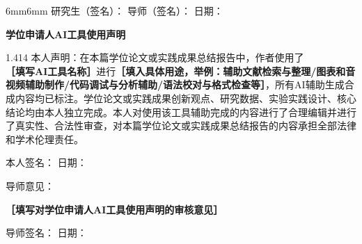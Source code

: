 \begin{titlepage}
\begin{adjustwidth}{6mm}{6mm}
\vspace{1.5\baselineskip}
{\STZhongsong 研究生（签名）：} \hspace{20mm} {\STZhongsong 导师（签名）：} \hspace{20mm} {\STZhongsong 日期：}


\newpage   %



\makebox[30mm]{\vspace{0mm}}
\begin{center}
\heiti{} \textbf{学位申请人AI工具使用声明} 
\end{center}
\vspace{1.5\baselineskip}
\begin{spacing}{1.414}
\STZhongsong{} 本人声明：在本篇学位论文或实践成果总结报告中，作者使用了\\ \hspace*{1mm}\textbf{［填写AI工具名称］}进行\textbf{［填入具体用途，举例：辅助文献检索与整理/图表和音视频辅助制作/代码调试与分析辅助/语法校对与格式检查等］}，所有AI辅助生成合成内容均已标注。学位论文或实践成果创新观点、研究数据、实验实践设计、核心结论均由本人独立完成。本人对使用该工具辅助完成的内容进行了合理编辑并进行了真实性、合法性审查，对本篇学位论文或实践成果总结报告的内容承担全部法律和学术伦理责任。
\end{spacing}

\vspace{1.5\baselineskip}
{\STZhongsong 本人签名：} \hspace{40mm} {\STZhongsong 日期：}

\vspace{3\baselineskip}
{\STZhongsong 导师意见：}

\textbf{{\STZhongsong{} ［填写对学位申请人AI工具使用声明的审核意见］ }}

\vspace{3\baselineskip}
{\STZhongsong 导师签名：} \hspace{40mm} {\STZhongsong 日期：}
\end{adjustwidth}
\end{titlepage}



